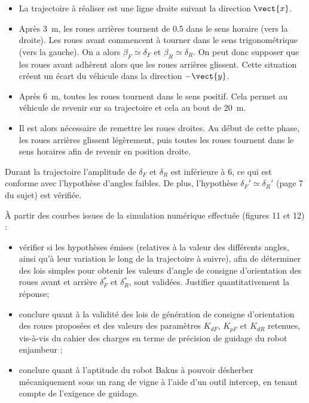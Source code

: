 \documentclass[11pt]{article}
\begin{document}
\begin{UPSTIcorrige}
\begin{itemize}
\item La trajectoire à réaliser est une ligne droite suivant la direction $\vect{x}$.
\item Après \SI{3}{m}, les roues arrières tournent de \SI{0,5}{\degres} dans le sens horaire (vers la droite). Les roues avant commencent à tourner dans le sens trigonométrique (vers la gauche).  On a alors $\beta_F \simeq \delta_F$ et $\beta_R \simeq \delta_R$. On peut donc supposer que les roues avant adhèrent alors que les roues arrières glissent. Cette situation créent un écart du véhicule dans la direction $-\vect{y}$.
\item Après \SI{6}{m}, toutes les roues tournent dans le sens positif. Cela permet au véhicule de revenir sur sa trajectoire et cela au bout de \SI{20}{m}. 
\item Il est alors nécessaire de remettre les roues droites. Au début de cette phase, les roues arrières glissent légèrement, puis toutes les roues tournent dans le sens horaires afin de revenir en position droite.
\end{itemize}

Durant la trajectoire l'amplitude de $\delta_F$ et $\delta_R$ est inférieure à 6\degres, ce qui est conforme avec l'hypothèse d'angles faibles. De plus,  l'hypothèse $\delta_F'\simeq \delta_R'$ (page 7 du sujet) est vérifiée. 
\end{UPSTIcorrige}



\UPSTIquestion  À partir des courbes issues de la simulation numérique effectuée (figures 11 et 12) :
\begin{itemize}
\item vérifier si les hypothèses émises (relatives à la valeur des différents angles, ainsi qu’à leur variation le long
de la trajectoire à suivre), afin de déterminer des lois simples pour obtenir les valeurs d’angle de consigne
d’orientation des roues avant et arrière $\delta_F^*$ et $\delta_R^*$, sont validées. Justifier quantitativement la réponse;
\item conclure quant à la validité des lois de génération de consigne d’orientation des roues proposées et des valeurs
des paramètres $K_{dF}$, $K_{pF}$ et $K_{dR}$ retenues, vis-à-vis du cahier des charges en terme de précision de guidage du robot enjambeur ;
\item conclure quant à l’aptitude du robot Bakus à pouvoir désherber mécaniquement sous un rang de vigne à
l’aide d’un outil intercep, en tenant compte de l’exigence de guidage.
\end{itemize}
\end{document}

